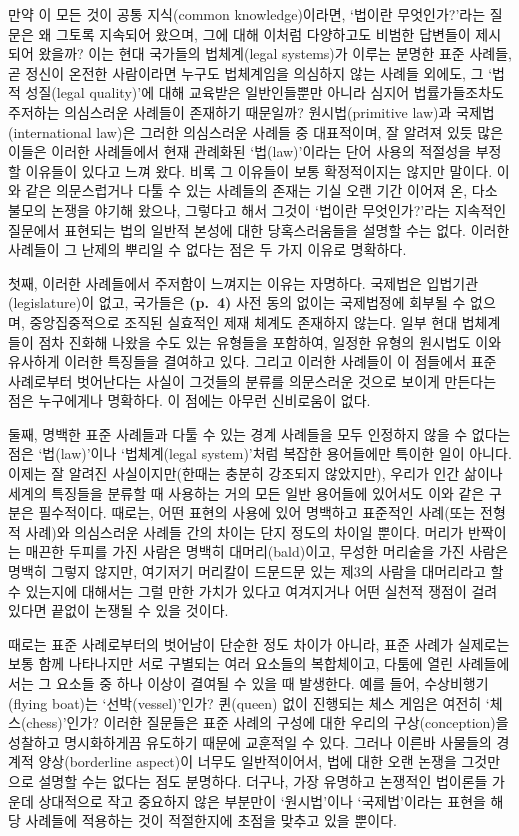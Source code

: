 만약 이 모든 것이 공통 지식(common knowledge)이라면, ‘법이란
무엇인가?’라는 질문은 왜 그토록 지속되어 왔으며, 그에 대해 이처럼
다양하고도 비범한 답변들이 제시되어 왔을까? 이는 현대 국가들의
법체계(legal systems)가 이루는 분명한 표준 사례들, 곧 정신이 온전한
사람이라면 누구도 법체계임을 의심하지 않는 사례들 외에도, 그 ‘법적
성질(legal quality)’에 대해 교육받은 일반인들뿐만 아니라 심지어
법률가들조차도 주저하는 의심스러운 사례들이 존재하기 때문일까?
원시법(primitive law)과 국제법(international law)은 그러한 의심스러운
사례들 중 대표적이며, 잘 알려져 있듯 많은 이들은 이러한 사례들에서 현재
관례화된 ‘법(law)’이라는 단어 사용의 적절성을 부정할 이유들이 있다고
느껴 왔다. 비록 그 이유들이 보통 확정적이지는 않지만 말이다. 이와 같은
의문스럽거나 다툴 수 있는 사례들의 존재는 기실 오랜 기간 이어져 온, 다소
불모의 논쟁을 야기해 왔으나, 그렇다고 해서 그것이 ‘법이란 무엇인가?’라는
지속적인 질문에서 표현되는 법의 일반적 본성에 대한 당혹스러움들을 설명할
수는 없다. 이러한 사례들이 그 난제의 뿌리일 수 없다는 점은 두 가지
이유로 명확하다.

첫째, 이러한 사례들에서 주저함이 느껴지는 이유는 자명하다. 국제법은
입법기관(legislature)이 없고, 국가들은 \textbf{(p.~4)} 사전 동의 없이는
국제법정에 회부될 수 없으며, 중앙집중적으로 조직된 실효적인 제재 체계도
존재하지 않는다. 일부 현대 법체계들이 점차 진화해 나왔을 수도 있는
유형들을 포함하여, 일정한 유형의 원시법도 이와 유사하게 이러한 특징들을
결여하고 있다. 그리고 이러한 사례들이 이 점들에서 표준 사례로부터
벗어난다는 사실이 그것들의 분류를 의문스러운 것으로 보이게 만든다는 점은
누구에게나 명확하다. 이 점에는 아무런 신비로움이 없다.

둘째, 명백한 표준 사례들과 다툴 수 있는 경계 사례들을 모두 인정하지 않을
수 없다는 점은 ‘법(law)’이나 ‘법체계(legal system)’처럼 복잡한
용어들에만 특이한 일이 아니다. 이제는 잘 알려진 사실이지만(한때는 충분히
강조되지 않았지만), 우리가 인간 삶이나 세계의 특징들을 분류할 때
사용하는 거의 모든 일반 용어들에 있어서도 이와 같은 구분은 필수적이다.
때로는, 어떤 표현의 사용에 있어 명백하고 표준적인 사례(또는 전형적
사례)와 의심스러운 사례들 간의 차이는 단지 정도의 차이일 뿐이다. 머리가
반짝이는 매끈한 두피를 가진 사람은 명백히 대머리(bald)이고, 무성한
머리숱을 가진 사람은 명백히 그렇지 않지만, 여기저기 머리칼이 드문드문
있는 제3의 사람을 대머리라고 할 수 있는지에 대해서는 그럴 만한 가치가
있다고 여겨지거나 어떤 실천적 쟁점이 걸려 있다면 끝없이 논쟁될 수 있을
것이다.

때로는 표준 사례로부터의 벗어남이 단순한 정도 차이가 아니라, 표준 사례가
실제로는 보통 함께 나타나지만 서로 구별되는 여러 요소들의 복합체이고,
다툼에 열린 사례들에서는 그 요소들 중 하나 이상이 결여될 수 있을 때
발생한다. 예를 들어, 수상비행기(flying boat)는 ‘선박(vessel)’인가?
퀸(queen) 없이 진행되는 체스 게임은 여전히 ‘체스(chess)’인가? 이러한
질문들은 표준 사례의 구성에 대한 우리의 구상(conception)을 성찰하고
명시화하게끔 유도하기 때문에 교훈적일 수 있다. 그러나 이른바 사물들의
경계적 양상(borderline aspect)이 너무도 일반적이어서, 법에 대한 오랜
논쟁을 그것만으로 설명할 수는 없다는 점도 분명하다. 더구나, 가장
유명하고 논쟁적인 법이론들 가운데 상대적으로 작고 중요하지 않은 부분만이
‘원시법’이나 ‘국제법’이라는 표현을 해당 사례들에 적용하는 것이
적절한지에 초점을 맞추고 있을 뿐이다.

